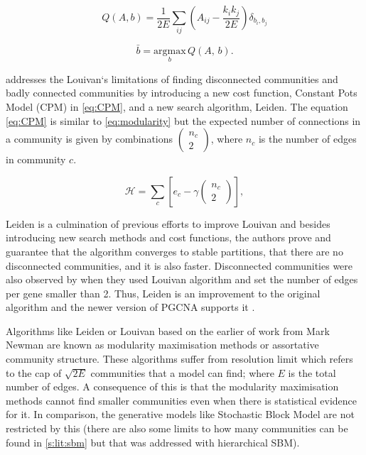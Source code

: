 \begin{equation} \label{eq:mod_max_cost}
    Q(A,b) = \frac{1}{2E} \sum_{ij} \left( A_{ij} - \frac{k_i k_j}{2E} \right) \delta_{b_i, b_j}
\end{equation}

\begin{equation} \label{eq:mod_max_per_com}
    \bar{b} = \underset{b}{\mathrm{argmax}} \, Q(A, \, b).
\end{equation}

\citet{Traag2019-ne} addresses the Louivan`s limitations of finding disconnected communities and badly connected communities by introducing a new cost function, Constant Pots Model (CPM) in \cref{eq:CPM}, and a new search algorithm, Leiden. The equation \cref{eq:CPM} is similar to \cref{eq:modularity} but the expected number of connections in a community is given by combinations $(\begin{array}{c}{n}_{c}\\ 2\end{array})$, where $n_c$ is the number of edges in community $c$.

\begin{equation} \label{eq:CPM}
    {\mathcal H} ={\sum }_{c}[{e}_{c}-\gamma (\begin{array}{c}{n}_{c}\\ 2\end{array})],
\end{equation}

Leiden is a culmination of previous efforts to improve Louivan \citep{Ozaki2016-dl, Waltman2013-zw, Bae2017-rz, Traag2015-tq} and besides introducing new search methods and cost functions, the authors prove and guarantee that the algorithm converges to stable partitions, that there are no disconnected communities, and it is also faster. Disconnected communities were also observed by \citet{Care2019-ij} when they used Louivan algorithm and set the number of edges per gene smaller than 2. Thus, Leiden is an improvement to the original algorithm and the newer version of PGCNA supports it \citep{Care2019-ij} .

Algorithms like Leiden or Louivan based on the earlier of work from Mark Newman \citep{Newman2004-dd, Newman2006-fa} are known as modularity maximisation methods or assortative community structure. These algorithms suffer from resolution limit \citep{Fortunato2007-gh, Peixoto2021-jx} which refers to the cap of $\sqrt{2E}$ communities that a model can find; where $E$ is the total number of edges. A consequence of this is that the modularity maximisation methods cannot find smaller communities even when there is statistical evidence for it. In comparison, the generative models like Stochastic Block Model are not restricted by this (there are also some limits to how many communities can be found in \cref{s:lit:sbm} but that was addressed with hierarchical SBM).

